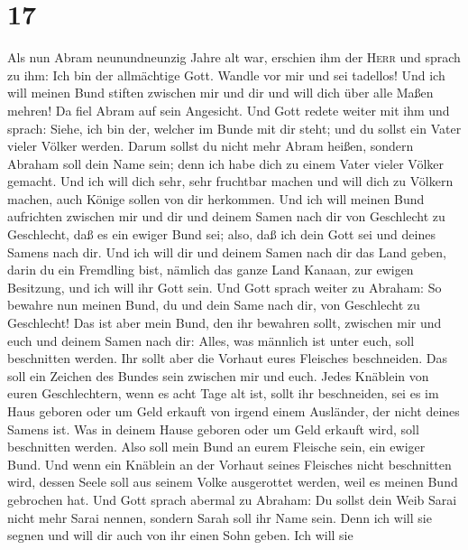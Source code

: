 \hypertarget{section-16}{%
\section{17}\label{section-16}}

 Als nun Abram neunundneunzig Jahre alt war, erschien ihm
der \textsc{Herr} und sprach zu ihm: Ich bin der allmächtige Gott.
Wandle vor mir und sei tadellos!  Und ich will meinen Bund
stiften zwischen mir und dir und will dich über alle Maßen mehren!
 Da fiel Abram auf sein Angesicht. Und Gott redete weiter
mit ihm und sprach:  Siehe, ich bin der, welcher im Bunde
mit dir steht; und du sollst ein Vater vieler Völker werden.
 Darum sollst du nicht mehr Abram heißen, sondern Abraham
soll dein Name sein; denn ich habe dich zu einem Vater vieler Völker
gemacht.  Und ich will dich sehr, sehr fruchtbar machen
und will dich zu Völkern machen, auch Könige sollen von dir herkommen.
 Und ich will meinen Bund aufrichten zwischen mir und dir
und deinem Samen nach dir von Geschlecht zu Geschlecht, daß es ein
ewiger Bund sei; also, daß ich dein Gott sei und deines Samens nach dir.
 Und ich will dir und deinem Samen nach dir das Land
geben, darin du ein Fremdling bist, nämlich das ganze Land Kanaan, zur
ewigen Besitzung, und ich will ihr Gott sein.  Und Gott
sprach weiter zu Abraham: So bewahre nun meinen Bund, du und dein Same
nach dir, von Geschlecht zu Geschlecht!  Das ist aber
mein Bund, den ihr bewahren sollt, zwischen mir und euch und deinem
Samen nach dir: Alles, was männlich ist unter euch, soll beschnitten
werden.  Ihr sollt aber die Vorhaut eures Fleisches
beschneiden. Das soll ein Zeichen des Bundes sein zwischen mir und euch.
 Jedes Knäblein von euren Geschlechtern, wenn es acht
Tage alt ist, sollt ihr beschneiden, sei es im Haus geboren oder um Geld
erkauft von irgend einem Ausländer, der nicht deines Samens ist.
 Was in deinem Hause geboren oder um Geld erkauft wird,
soll beschnitten werden. Also soll mein Bund an eurem Fleische sein, ein
ewiger Bund.  Und wenn ein Knäblein an der Vorhaut seines
Fleisches nicht beschnitten wird, dessen Seele soll aus seinem Volke
ausgerottet werden, weil es meinen Bund gebrochen hat. 
Und Gott sprach abermal zu Abraham: Du sollst dein Weib Sarai nicht mehr
Sarai nennen, sondern Sarah soll ihr Name sein.  Denn ich
will sie segnen und will dir auch von ihr einen Sohn geben. Ich will sie
